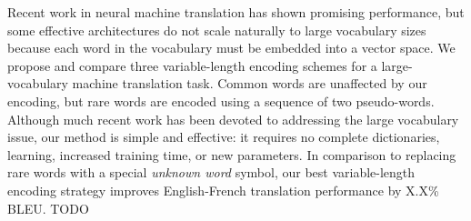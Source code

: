 Recent work in neural machine translation has shown promising performance, but some effective
architectures do not scale naturally to large vocabulary sizes because each
word in the vocabulary must be embedded into a vector space. We propose and compare
three variable-length encoding schemes for a large-vocabulary machine
translation task. Common words are unaffected by our encoding, but rare
words are encoded using a sequence of two pseudo-words. Although much recent work
has been devoted to addressing the large vocabulary issue, our method is simple and effective:
it requires no complete dictionaries, learning, increased training time, or new parameters. In comparison to
replacing rare words with a special \emph{unknown word} symbol, our best
variable-length encoding strategy improves English-French translation
performance by X.X\% BLEU. TODO
